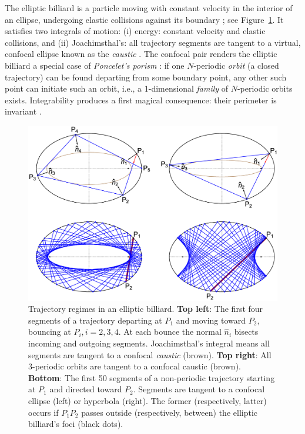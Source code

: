The elliptic billiard is a particle moving with constant velocity in the interior of an ellipse, undergoing elastic collisions against its boundary \cite{rozikov2018,sergei91}; see Figure~\ref{fig:billiard-trajectories}. It satisfies two integrals of motion: (i) energy: constant velocity and elastic collisions, and (ii) Joachimsthal's: all trajectory segments are tangent to a virtual, confocal ellipse known as the {\em caustic} \cite{sergei91}. The confocal pair renders the elliptic billiard a special case of {\em Poncelet's porism} \cite{dragovic11}: if one $N$-periodic {\em orbit} (a closed trajectory) can be found departing from some boundary point, any other such point can initiate such an orbit, i.e., a 1-dimensional {\em family} of $N$-periodic orbits exists. Integrability produces a first magical consequence: their perimeter is invariant \cite{sergei91}. 

\begin{figure}[H]
    \centering
    \includegraphics[width=.8\textwidth]{1010_billiard_trajectories.eps}
    \caption{Trajectory regimes in an elliptic billiard. \textbf{Top left}: The first four segments of a trajectory departing at $P_1$ and moving toward $P_2$, bouncing at $P_i, i=2,3,4$. At each bounce the normal $\hat{n}_i$ bisects incoming and outgoing segments. Joachimsthal's integral \cite{sergei91} means all segments are tangent to a confocal {\em caustic} (brown). \textbf{Top right}: All 3-periodic orbits are tangent to a confocal caustic (brown). \textbf{Bottom}: The first 50 segments of a non-periodic trajectory starting at $P_1$ and directed toward $P_2$. Segments are tangent to a confocal ellipse (left) or hyperbola (right). The former (respectively, latter) occurs if $P_1P_2$ passes outside (respectively, between) the elliptic billiard's foci (black dots).}
    \label{fig:billiard-trajectories}
\end{figure}

